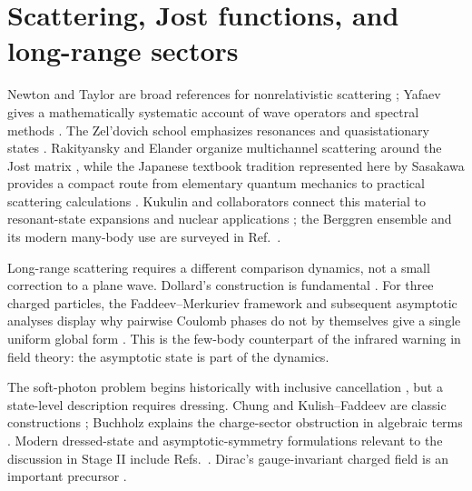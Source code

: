 \section*{Scattering, Jost functions, and long-range sectors}

Newton and Taylor are broad references for nonrelativistic scattering
\cite{Newton:1960,Taylor:1972}; Yafaev gives a mathematically systematic
account of wave operators and spectral methods \cite{Yafaev:1992}.  The
Zel'dovich school emphasizes resonances and quasistationary states
\cite{PerelomovZeldovich:1998}.  Rakityansky and Elander organize multichannel
scattering around the Jost matrix \cite{Rakityansky:2022Jost}, while the
Japanese textbook tradition represented here by Sasakawa provides a compact
route from elementary quantum mechanics to practical scattering
calculations \cite{Sasakawa:1991}.  Kukulin and collaborators connect this
material to resonant-state expansions and nuclear applications
\cite{Kukulin:1989}; the Berggren ensemble and its modern many-body use are
surveyed in Ref.~\cite{MichelPloszajczak:2021}.

Long-range scattering requires a different comparison dynamics, not a small
correction to a plane wave.  Dollard's construction is fundamental
\cite{Dollard:1964,Dollard:1971}.  For three charged particles, the
Faddeev--Merkuriev framework and subsequent asymptotic analyses display why
pairwise Coulomb phases do not by themselves give a single uniform global
form \cite{FaddeevMerkuriev:1993,AltMukhamedzhanov:1993,
MukhamedzhanovLieber:1996,Kadyrov:2003ThreeBody,Mukhamedzhanov:2006Leading,
Yakovlev:2022Coulomb,Keller:2009FaddeevMerkuriev}.  This is the few-body
counterpart of the infrared warning in field theory: the asymptotic state is
part of the dynamics.

The soft-photon problem begins historically with inclusive cancellation
\cite{BlochNordsieck:1937,YennieFrautschiSuura:1961}, but a state-level
description requires dressing.  Chung and Kulish--Faddeev are classic
constructions \cite{Chung:1965,KulishFaddeev:1970}; Buchholz explains the
charge-sector obstruction in algebraic terms \cite{Buchholz:1986}.  Modern
dressed-state and asymptotic-symmetry formulations relevant to the discussion
in Stage II include Refs.~\cite{ChenFrohlichPizzo:2010,
HiraiSugishita:2019,HiraiSugishita:2021,HiraiSugishita:2023}.  Dirac's
gauge-invariant charged field is an important precursor
\cite{Dirac:1955GaugeInvariant}.

